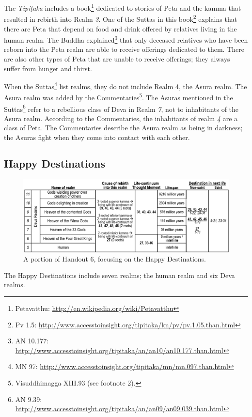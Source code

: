 The \textit{Tipiṭaka} includes a book\footnote{Petavatthu: \url{http://en.wikipedia.org/wiki/Petavatthu}} dedicated to stories of Peta and the kamma that resulted in rebirth into Realm \textit{3}. One of the Suttas in this book\footnote{Pv 1.5: \url{http://www.accesstoinsight.org/tipitaka/kn/pv/pv.1.05.than.html}} explains that there are Peta that depend on food and drink offered by relatives living in the human realm. The Buddha explained\footnote{AN 10.177: \url{http://www.accesstoinsight.org/tipitaka/an/an10/an10.177.than.html}} that only deceased relatives who have been reborn into the Peta realm are able to receive offerings dedicated to them. There are also other types of Peta that are unable to receive offerings; they always suffer from hunger and thirst.

When the Suttas\footnote{MN 97: \url{http://www.accesstoinsight.org/tipitaka/mn/mn.097.than.html}} list realms, they do not include Realm 4, the Asura realm. The Asura realm was added by the Commentaries\footnote{Visuddhimagga XIII.93 (see footnote 2).}. The Asuras mentioned in the Suttas\footnote{AN 9.39: \url{http://www.accesstoinsight.org/tipitaka/an/an09/an09.039.than.html}} refer to a rebellious class of Deva in Realm \textit{7}, not to inhabitants of the Asura realm. According to the Commentaries, the inhabitants of realm \textit{4} are a class of Peta. The Commentaries describe the Asura realm as being in darkness; the Asuras fight when they come into contact with each other.

\subsection*{Happy Destinations}

\begin{figure}[h]
\centering
\includegraphics[width=0.9\linewidth]{./Diagrams/Happy1}
\caption{A portion of Handout 6, focusing on the Happy Destinations.}
\label{fig:Happy1}
\end{figure}

The Happy Destinations include seven realms; the human realm and six Deva realms.

